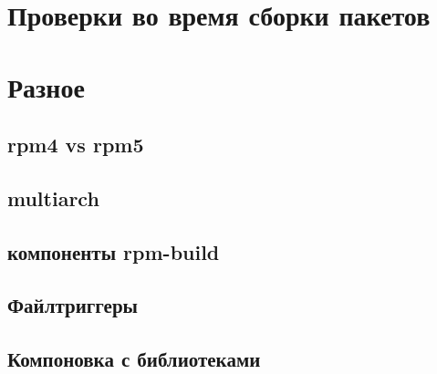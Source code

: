 \documentclass[russian,a4paper,12pt,titlepage]{article}
\begin{document}
\label{debuginfo-subpackages}

\section{Проверки во время сборки пакетов}

\label{brp-verify}

\section{Разное}

\subsection{rpm4 vs rpm5}

\subsection{multiarch}

\subsection{компоненты rpm-build}

\subsection{Файлтриггеры}

\subsection{Компоновка с библиотеками}
\label{linkning-with-libraries}
\end{document}

